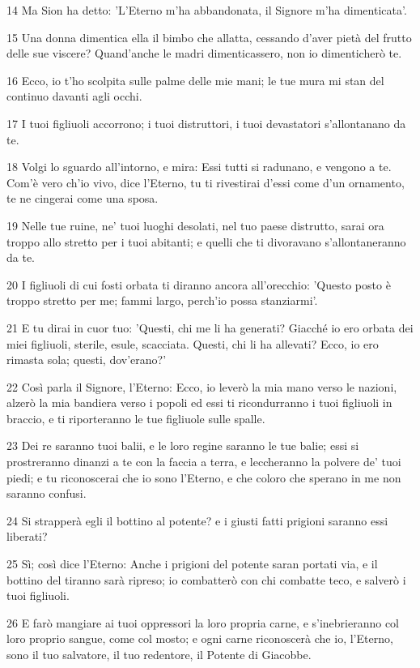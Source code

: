 \par 14 Ma Sion ha detto: 'L'Eterno m'ha abbandonata, il Signore m'ha dimenticata'.
\par 15 Una donna dimentica ella il bimbo che allatta, cessando d'aver pietà del frutto delle sue viscere? Quand'anche le madri dimenticassero, non io dimenticherò te.
\par 16 Ecco, io t'ho scolpita sulle palme delle mie mani; le tue mura mi stan del continuo davanti agli occhi.
\par 17 I tuoi figliuoli accorrono; i tuoi distruttori, i tuoi devastatori s'allontanano da te.
\par 18 Volgi lo sguardo all'intorno, e mira: Essi tutti si radunano, e vengono a te. Com'è vero ch'io vivo, dice l'Eterno, tu ti rivestirai d'essi come d'un ornamento, te ne cingerai come una sposa.
\par 19 Nelle tue ruine, ne' tuoi luoghi desolati, nel tuo paese distrutto, sarai ora troppo allo stretto per i tuoi abitanti; e quelli che ti divoravano s'allontaneranno da te.
\par 20 I figliuoli di cui fosti orbata ti diranno ancora all'orecchio: 'Questo posto è troppo stretto per me; fammi largo, perch'io possa stanziarmi'.
\par 21 E tu dirai in cuor tuo: 'Questi, chi me li ha generati? Giacché io ero orbata dei miei figliuoli, sterile, esule, scacciata. Questi, chi li ha allevati? Ecco, io ero rimasta sola; questi, dov'erano?'
\par 22 Così parla il Signore, l'Eterno: Ecco, io leverò la mia mano verso le nazioni, alzerò la mia bandiera verso i popoli ed essi ti ricondurranno i tuoi figliuoli in braccio, e ti riporteranno le tue figliuole sulle spalle.
\par 23 Dei re saranno tuoi balii, e le loro regine saranno le tue balie; essi si prostreranno dinanzi a te con la faccia a terra, e leccheranno la polvere de' tuoi piedi; e tu riconoscerai che io sono l'Eterno, e che coloro che sperano in me non saranno confusi.
\par 24 Si strapperà egli il bottino al potente? e i giusti fatti prigioni saranno essi liberati?
\par 25 Sì; così dice l'Eterno: Anche i prigioni del potente saran portati via, e il bottino del tiranno sarà ripreso; io combatterò con chi combatte teco, e salverò i tuoi figliuoli.
\par 26 E farò mangiare ai tuoi oppressori la loro propria carne, e s'inebrieranno col loro proprio sangue, come col mosto; e ogni carne riconoscerà che io, l'Eterno, sono il tuo salvatore, il tuo redentore, il Potente di Giacobbe.

